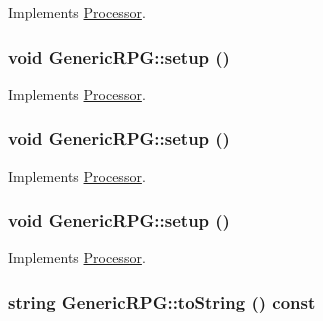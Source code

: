 Implements \hyperlink{classProcessor_3280abfe3637712e09cc651b2d09732e}{Processor}.\hypertarget{classGenericRPG_e872cb83c70fbf7139fbf1b5cf14310f}{
\subsubsection[{setup}]{\setlength{\rightskip}{0pt plus 5cm}void GenericRPG::setup ()}}
\label{classGenericRPG_e872cb83c70fbf7139fbf1b5cf14310f}




Implements \hyperlink{classProcessor_495fad01358e2d9760c526d6e2db53ea}{Processor}.\hypertarget{classGenericRPG_e872cb83c70fbf7139fbf1b5cf14310f}{
\subsubsection[{setup}]{\setlength{\rightskip}{0pt plus 5cm}void GenericRPG::setup ()}}
\label{classGenericRPG_e872cb83c70fbf7139fbf1b5cf14310f}




Implements \hyperlink{classProcessor_495fad01358e2d9760c526d6e2db53ea}{Processor}.\hypertarget{classGenericRPG_e872cb83c70fbf7139fbf1b5cf14310f}{
\subsubsection[{setup}]{\setlength{\rightskip}{0pt plus 5cm}void GenericRPG::setup ()}}
\label{classGenericRPG_e872cb83c70fbf7139fbf1b5cf14310f}




Implements \hyperlink{classProcessor_495fad01358e2d9760c526d6e2db53ea}{Processor}.\hypertarget{classGenericRPG_a4303867728559ab6e6ae3d1390ede71}{
\subsubsection[{toString}]{\setlength{\rightskip}{0pt plus 5cm}string GenericRPG::toString () const}}
\label{classGenericRPG_a4303867728559ab6e6ae3d1390ede71}




